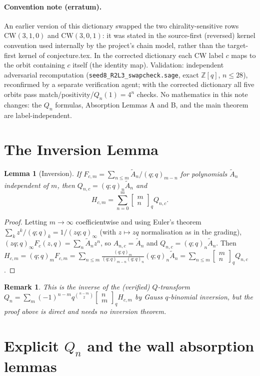 \documentclass[11pt]{article}
\newtheorem{lemma}[theorem]{Lemma}
\newtheorem{remark}[theorem]{Remark}
\newcommand{\qbin}[2]{\begin{bmatrix}#1\\#2\end{bmatrix}_q}
\newcommand{\poch}[1]{(q;q)_{#1}}
\begin{document}
\paragraph{Convention note (erratum).}
An earlier version of this dictionary swapped the two chirality-sensitive rows
$\mathrm{CW}(3,1,0)$ and $\mathrm{CW}(3,0,1)$: it was stated in the source-first
(reversed) kernel convention used internally by the project's chain model, rather
than the target-first kernel of conjecture.tex. In the corrected dictionary each
CW label $c$ maps to the orbit containing $c$ itself (the identity map).
Validation: independent adversarial recomputation
(\texttt{seed8\_R2L3\_swapcheck.sage}, exact $\mathbb{Z}[q]$, $n\le28$), reconfirmed
by a separate verification agent; with the corrected dictionary all five orbits
pass match/positivity/$Q_n(1)=4^n$ checks. No mathematics in this note changes:
the $Q_n$ formulas, Absorption Lemmas A and B, and the main theorem are label-independent.

\section*{The Inversion Lemma}

\begin{lemma}[Inversion]\label{lem:inv}
If $F_{c,m}=\sum_{n\le m}\widetilde A_n/\poch{m-n}$ for polynomials $\widetilde A_n$
independent of $m$, then $Q_{n,c}=\poch{n}\widetilde A_n$ and
\[
H_{c,m}=\sum_{n=0}^{m}\qbin{m}{n}Q_{n,c}.
\]
\end{lemma}

\begin{proof}
Letting $m\to\infty$ coefficientwise and using Euler's theorem
$\sum_{k}z^k/\poch{k}=1/(zq;q)_\infty$ (with $z\mapsto zq$ normalisation as in the
grading), $(zq;q)_\infty F_c(z,q)=\sum_n\widetilde A_nz^n$, so $A_{n,c}=\widetilde A_n$
and $Q_{n,c}=\poch{n}\widetilde A_n$. Then
$H_{c,m}=\poch{m}F_{c,m}=\sum_{n\le m}\frac{\poch{m}}{\poch{m-n}\poch{n}}\poch{n}
\widetilde A_n=\sum_{n\le m}\qbin{m}{n}Q_{n,c}$.
\end{proof}

\begin{remark}
This is the inverse of the (verified) $Q$-transform
$Q_n=\sum_m(-1)^{n-m}q^{\binom{n-m}{2}}\qbin{n}{m}H_{c,m}$ by Gauss $q$-binomial
inversion, but the proof above is direct and needs no inversion theorem.
\end{remark}

\section*{Explicit $Q_n$ and the wall absorption lemmas}
\end{document}
